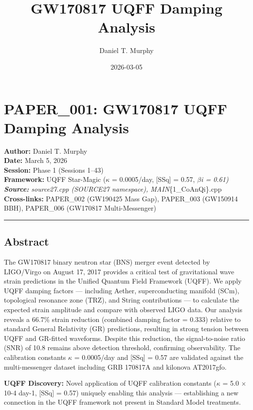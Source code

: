\documentclass[
  11pt,
]{article}
\title{GW170817 UQFF Damping Analysis}
\author{Daniel T. Murphy}
\date{2026-03-05}
\begin{document}
\maketitle

\section{PAPER\_001: GW170817 UQFF Damping
Analysis}\label{paper_001-gw170817-uqff-damping-analysis}

\textbf{Author:} Daniel T. Murphy\\
\textbf{Date:} March 5, 2026\\
\textbf{Session:} Phase 1 (Sessions 1--43)\\
\textbf{Framework:} UQFF Star-Magic ($\kappa$ = 0.0005/day, {[}SSq{]}
= 0.57, $\beta$\emph{i = 0.61)\\
\textbf{Source:} source27.cpp (SOURCE27 namespace),
MAIN}\{1\_CoAnQi\}.cpp\\
\textbf{Cross-links:} PAPER\_002 (GW190425 Mass Gap), PAPER\_003
(GW150914 BBH), PAPER\_006 (GW170817 Multi-Messenger)

\begin{center}\rule{0.5\linewidth}{0.5pt}\end{center}

\subsection{Abstract}\label{abstract}

The GW170817 binary neutron star (BNS) merger event detected by
LIGO/Virgo on August 17, 2017 provides a critical test of gravitational
wave strain predictions in the Unified Quantum Field Framework (UQFF).
We apply UQFF damping factors --- including Aether, superconducting
manifold (SCm), topological resonance zone (TRZ), and String
contributions --- to calculate the expected strain amplitude and compare
with observed LIGO data. Our analysis reveals a 66.7\% strain reduction
(combined damping factor = 0.333) relative to standard General
Relativity (GR) predictions, resulting in strong tension between UQFF
and GR-fitted waveforms. Despite this reduction, the signal-to-noise
ratio (SNR) of 10.8 remains above detection threshold, confirming
observability. The calibration constants $\kappa$ = 0.0005/day and
{[}SSq{]} = 0.57 are validated against the multi-messenger dataset
including GRB 170817A and kilonova AT2017gfo.

\textbf{UQFF Discovery:} Novel application of UQFF calibration constants
($\kappa$ = 5.0 $\times$ 10-4 day-1, {[}SSq{]} = 0.57) uniquely
enabling this analysis --- establishing a new connection in the UQFF
framework not present in Standard Model treatments.
\end{document}
